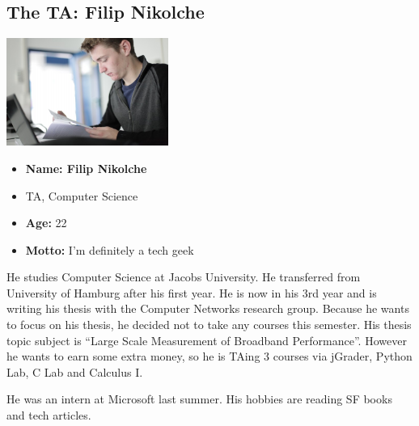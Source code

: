 \subsection{The TA: Filip Nikolche}

\includegraphics[width=200px]{personas/filip.png}
\begin{itemize}
  \item \textbf{Name: Filip Nikolche}
  \item TA, Computer Science
  \item \textbf{Age:} 22
  \item \textbf{Motto:} I'm definitely a tech geek
\end{itemize}


He studies Computer Science at Jacobs University. He transferred from University of Hamburg after his first year. He is now in his 3rd year and is writing his thesis with the Computer Networks research group.
Because he wants to focus on his thesis, he decided not to take any courses this semester. His thesis topic subject is ``Large Scale Measurement of Broadband Performance''. However he wants to earn some extra money, so he is TAing 3 courses via jGrader, Python Lab, C Lab and Calculus I.

He was an intern at Microsoft last summer. His hobbies are reading SF books and tech articles.
